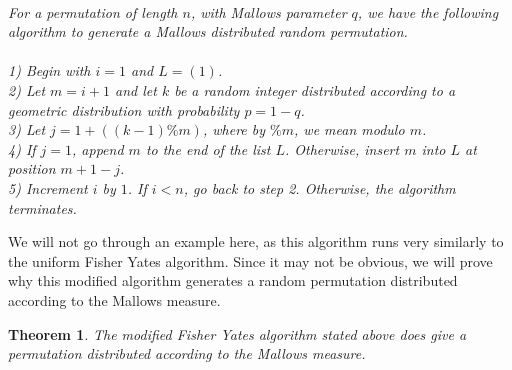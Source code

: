 \documentclass[12pt]{report}
\newtheorem{thm}{Theorem}[section]
\theoremstyle{definition}
\begin{document}
\begin{fy2}
\ \\
{\em For a permutation of length $n$, with Mallows parameter $q$, we have the following algorithm to generate a Mallows distributed random permutation. \\ \\
1) Begin with $i=1$ and $L=(1)$. \\
2) Let $m=i+1$ and let $k$ be a random integer distributed according to a geometric distribution with probability $p=1-q$.   \\
3) Let $j=1+((k-1)\%m)$, where by $\%m$, we mean modulo $m$. \\
4) If $j=1$, append $m$ to the end of the list $L$.  Otherwise, insert $m$ into $L$ at position $m+1-j$.  \\
5) Increment $i$ by $1$.  If $i<n$, go back to step 2.  Otherwise, the algorithm terminates.

}
\end{fy2}
We will not go through an example here, as this algorithm runs very similarly to the uniform Fisher Yates algorithm.  Since it may not be obvious, we will prove why this modified algorithm generates a random permutation distributed according to the Mallows measure.  
\begin{thm}
The modified Fisher Yates algorithm stated above does give a permutation distributed according to the Mallows measure.
\end{thm}
\end{document}

